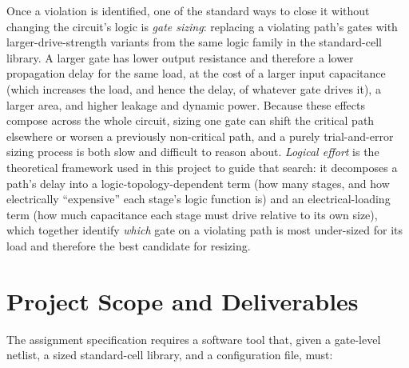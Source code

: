 Once a violation is identified, one of the standard ways to close it without
changing the circuit's logic is \emph{gate sizing}: replacing a violating
path's gates with larger-drive-strength variants from the same logic family
in the standard-cell library. A larger gate has lower output resistance and
therefore a lower propagation delay for the same load, at the cost of a
larger input capacitance (which increases the load, and hence the delay, of
whatever gate drives it), a larger area, and higher leakage and dynamic
power. Because these effects compose across the whole circuit, sizing one
gate can shift the critical path elsewhere or worsen a previously
non-critical path, and a purely trial-and-error sizing process is both slow
and difficult to reason about. \emph{Logical effort} is the theoretical
framework used in this project to guide that search: it decomposes a path's
delay into a logic-topology-dependent term (how many stages, and how
electrically ``expensive'' each stage's logic function is) and an
electrical-loading term (how much capacitance each stage must drive relative
to its own size), which together identify \emph{which} gate on a violating
path is most under-sized for its load and therefore the best candidate for
resizing.

\section{Project Scope and Deliverables}
\label{sec:intro-scope}

The assignment specification requires a software tool that, given a gate-level
netlist, a sized standard-cell library, and a configuration file, must:

